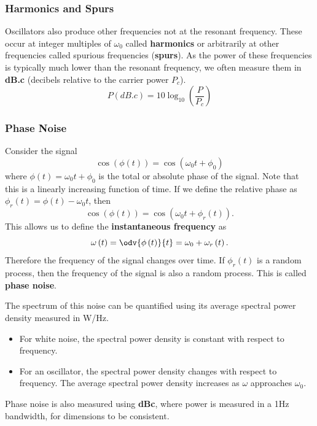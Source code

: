 \documentclass{article}
\begin{document}
\subsubsection{Harmonics and Spurs}
Oscillators also produce other frequencies not at the resonant
frequency. These occur at integer multiples of \(\omega_0\) called
\textbf{harmonics} or arbitrarily at other frequencies called spurious
frequencies (\textbf{spurs}).
As the power of these frequencies is typically much lower than the
resonant frequency, we often measure them in \textbf{dB.c} (decibels
relative to the carrier power \(P_c\)).
\begin{equation*}
    P (\unit{dB.c}) = 10 \log_{10}{\left( \frac{P}{P_c} \right)}
\end{equation*}
\subsubsection{Phase Noise}
Consider the signal
\begin{equation*}
    \cos{\left( \phi\left( t \right) \right)} = \cos{\left( \omega_0 t + \phi_0 \right)}
\end{equation*}
where \(\phi\left( t \right) = \omega_0 t + \phi_0\) is the total or
absolute phase of the signal. Note that this is a linearly increasing
function of time. If we define the relative phase as
\(\phi_r\left( t \right) = \phi\left( t \right) - \omega_0 t\), then
\begin{equation*}
    \cos{\left( \phi\left( t \right) \right)} = \cos{\left( \omega_0 t + \phi_r\left( t \right) \right)}.
\end{equation*}
This allows us to define the \textbf{instantaneous frequency} as
\begin{equation*}
    \omega\left( t \right) = \odv{\phi\left( t \right)}{t} = \omega_0 + \omega_r\left( t \right).
\end{equation*}
Therefore the frequency of the signal changes over time. If \(\phi_r\left( t \right)\)
is a random process, then the frequency of the signal is also a random
process. This is called \textbf{phase noise}.

The spectrum of this noise can be quantified using its average spectral
power density measured in \unit{W/Hz}.
\begin{itemize}
    \item For white noise, the spectral power density is constant with
          respect to frequency.
    \item For an oscillator, the spectral power density changes with
          respect to frequency. The average spectral power density
          increases as \(\omega\) approaches \(\omega_0\).
\end{itemize}
Phase noise is also measured using \textbf{dBc}, where power is measured
in a 1Hz bandwidth, for dimensions to be consistent.
\end{document}
